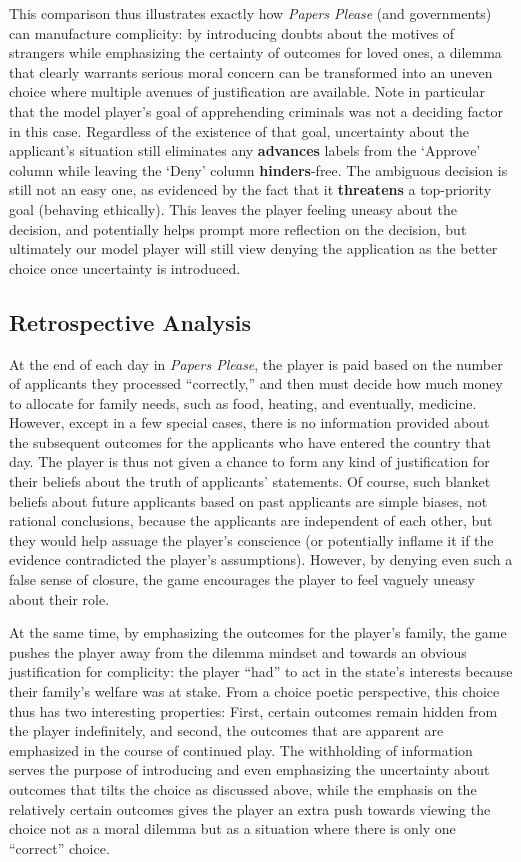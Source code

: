 \documentclass[arts,article,submit,moreauthors,pdftex,10pt,a4paper]{Definitions/mdpi}
\newcommand{\advances}{\textbf{\color{advances}advances}}
\newcommand{\threatens}{\textbf{\color{threatens}threatens}}
\newcommand{\hinders}{\textbf{\color{hinders}hinders}}
\begin{document}
This comparison thus illustrates exactly how \emph{Papers Please} (and governments) can manufacture complicity: by introducing doubts about the motives of strangers while emphasizing the certainty of outcomes for loved ones, a dilemma that clearly warrants serious moral concern can be transformed into an uneven choice where multiple avenues of justification are available.
%
Note in particular that the model player's goal of apprehending criminals was not a deciding factor in this case.
%
Regardless of the existence of that goal, uncertainty about the applicant's situation still eliminates any \advances{} labels from the `Approve' column while leaving the `Deny' column \hinders{}-free.
%
The ambiguous decision is still not an easy one, as evidenced by the fact that it \threatens{} a top-priority goal (behaving ethically).
%
This leaves the player feeling uneasy about the decision, and potentially helps prompt more reflection on the decision, but ultimately our model player will still view denying the application as the better choice once uncertainty is introduced.

\subsection{Retrospective Analysis}

At the end of each day in \emph{Papers Please}, the player is paid based on the number of applicants they processed ``correctly,'' and then must decide how much money to allocate for family needs, such as food, heating, and eventually, medicine.
%
However, except in a few special cases, there is no information provided about the subsequent outcomes for the applicants who have entered the country that day.
%
The player is thus not given a chance to form any kind of justification for their beliefs about the truth of applicants' statements.
%
Of course, such blanket beliefs about future applicants based on past applicants are simple biases, not rational conclusions, because the applicants are independent of each other, but they would help assuage the player's conscience (or potentially inflame it if the evidence contradicted the player's assumptions).
%
However, by denying even such a false sense of closure, the game encourages the player to feel vaguely uneasy about their role.


At the same time, by emphasizing the outcomes for the player's family, the game pushes the player away from the dilemma mindset and towards an obvious justification for complicity: the player ``had'' to act in the state's interests because their family's welfare was at stake.
%
From a choice poetic perspective, this choice thus has two interesting properties: First, certain outcomes remain hidden from the player indefinitely, and second, the outcomes that are apparent are emphasized in the course of continued play.
%
The withholding of information serves the purpose of introducing and even emphasizing the uncertainty about outcomes that tilts the choice as discussed above, while the emphasis on the relatively certain outcomes gives the player an extra push towards viewing the choice not as a moral dilemma but as a situation where there is only one ``correct'' choice.
\end{document}
